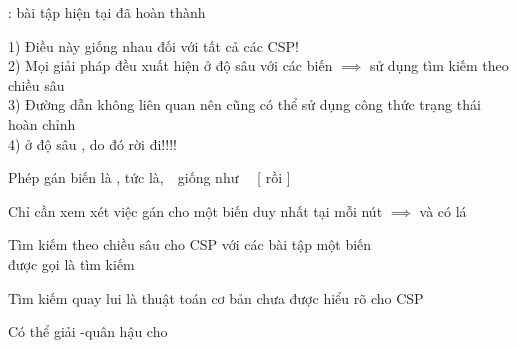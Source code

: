 \documentclass{article}
\begin{document}
\begin{huge}
\blob {}: bài tập hiện tại đã hoàn thành

\vspace*{0.3in}

1) Điều này giống nhau đối với tất cả các CSP! \smiley\\
2) Mọi giải pháp đều xuất hiện ở độ sâu  với các biến  \nl
   $\implies$ sử dụng tìm kiếm theo chiều sâu\\
3) Đường dẫn không liên quan nên cũng có thể sử dụng công thức trạng thái hoàn chỉnh\\
4)  ở độ sâu \mat{$\ell$}, do đó  rời đi!!!! \frowny




Phép gán biến là , tức là,\ \ giống như \ \ [ rồi ]

Chỉ cần xem xét việc gán cho một biến duy nhất tại mỗi nút\nl
   $\implies$  và có  lá\nl

Tìm kiếm theo chiều sâu cho CSP với các bài tập một biến \\
được gọi là tìm kiếm 

Tìm kiếm quay lui là thuật toán cơ bản chưa được hiểu rõ cho CSP

Có thể giải -quân hậu cho 






\maxfigwidth
{}


\maxfigwidth
{}


\maxfigwidth
{}


\end{huge}
\end{document}
